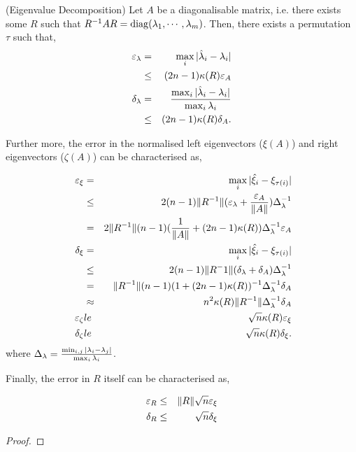 \begin{proposition}(Eigenvalue Decomposition)
  Let $A$ be a diagonalisable matrix, i.e. there exists some $R$ such that $R^{-1} A R = \operatorname{diag}(\lambda_1, \cdots, \lambda_m)$. Then,
    there exists a permutation $\tau$ such that,
  \begin{eqnarray}
    \varepsilon_{\lambda} &=& \max_i | \hat{\lambda}_i - \lambda_i | \\
      &\le& (2n -1)\kappa(R) \varepsilon_{A} \\
    \delta_{\lambda} &=& \frac{\max_i | \hat{\lambda}_i - \lambda_i |}{\max_i \lambda_i} \\
      &\le& (2n -1)\kappa(R) \delta_{A}.
  \end{eqnarray}

  Further more, the error in the normalised left eigenvectors ($\xi(A)$) and right eigenvectors ($\zeta(A)$) can be characterised as,

  \begin{eqnarray}
    \varepsilon_{\xi} 
      &=& \max_i |\hat{\xi}_i - \xi_{\tau(i)}| \\
      &\le& 2 (n-1) \|R^{-1}\| (\varepsilon_{\lambda} + \frac{\varepsilon_{A}}{\|A\|}) \Delta_{\lambda}^{-1} \\
      &=& 2 \|R^{-1}\| (n-1)(\frac{1}{\|A\|} + (2n-1)\kappa(R)) \Delta_{\lambda}^{-1} \varepsilon_{A} \\\
    \delta_{\xi} 
      &=& \max_i |\hat{\xi}_i - \xi_{\tau(i)}| \\
      &\le& 2 (n-1) \|R^-1\| (\delta_{\lambda} + \delta_{A}) \Delta_{\lambda}^{-1} \\
      &=& \|R^{-1}\| (n-1)(1 + (2n-1)\kappa(R)) ^{-1} \Delta_{\lambda}^{-1} \delta_{A} \\\
      &\approx& n^2 \kappa(R) \|R^{-1}\| \Delta_{\lambda}^{-1} \delta_{A} \\
    \varepsilon_{\zeta} 
      &le& \sqrt{n} \kappa(R) \varepsilon_{\xi} \\
    \delta_{\zeta} 
      &le& \sqrt{n} \kappa(R) \delta_{\xi}.
  \end{eqnarray}
  where $\Delta_{\lambda} = \frac{\min_{i,j} |\lambda_i - \lambda_j|}{\max_i \lambda_i}$.

  Finally, the error in $R$ itself can be characterised as,

  \begin{eqnarray}
    \varepsilon_{R} &\le&  \|R\| \sqrt{n} \varepsilon_{\xi} \\
    \delta_{R} &\le&  \sqrt{n} \delta_{\xi} 
  \end{eqnarray}

\end{proposition}
\begin{proof}
\end{proof}

